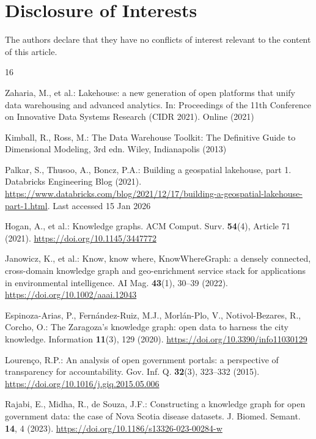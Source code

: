 \documentclass[runningheads]{llncs}
\renewcommand{\_}{\origunderscore\allowbreak}
\begin{document}
\section*{Disclosure of Interests}
The authors declare that they have no conflicts of interest relevant to the content
of this article.

\begingroup\scriptsize\setlength{\parskip}{0pt}\linespread{0.92}\selectfont
\begin{thebibliography}{16}

Zaharia, M., et al.: Lakehouse: a new generation of open platforms that unify data warehousing and advanced analytics. In: Proceedings of the 11th Conference on Innovative Data Systems Research (CIDR 2021). Online (2021)

Kimball, R., Ross, M.: The Data Warehouse Toolkit: The Definitive Guide to Dimensional Modeling, 3rd edn. Wiley, Indianapolis (2013)

Palkar, S., Thusoo, A., Boncz, P.A.: Building a geospatial lakehouse, part 1. Databricks Engineering Blog (2021). \url{https://www.databricks.com/blog/2021/12/17/building-a-geospatial-lakehouse-part-1.html}. Last accessed 15 Jan 2026

Hogan, A., et al.: Knowledge graphs. ACM Comput. Surv. \textbf{54}(4), Article 71 (2021). \url{https://doi.org/10.1145/3447772}

Janowicz, K., et al.: Know, know where, KnowWhereGraph: a densely connected, cross-domain knowledge graph and geo-enrichment service stack for applications in environmental intelligence. AI Mag. \textbf{43}(1), 30--39 (2022). \url{https://doi.org/10.1002/aaai.12043}

Espinoza-Arias, P., Fern\'andez-Ruiz, M.J., Morl\'an-Plo, V., Notivol-Bezares, R., Corcho, O.: The Zaragoza's knowledge graph: open data to harness the city knowledge. Information \textbf{11}(3), 129 (2020). \url{https://doi.org/10.3390/info11030129}

Louren\c{c}o, R.P.: An analysis of open government portals: a perspective of transparency for accountability. Gov. Inf. Q. \textbf{32}(3), 323--332 (2015). \url{https://doi.org/10.1016/j.giq.2015.05.006}

Rajabi, E., Midha, R., de Souza, J.F.: Constructing a knowledge graph for open government data: the case of Nova Scotia disease datasets. J. Biomed. Semant. \textbf{14}, 4 (2023). \url{https://doi.org/10.1186/s13326-023-00284-w}


\end{thebibliography}
\end{document}
